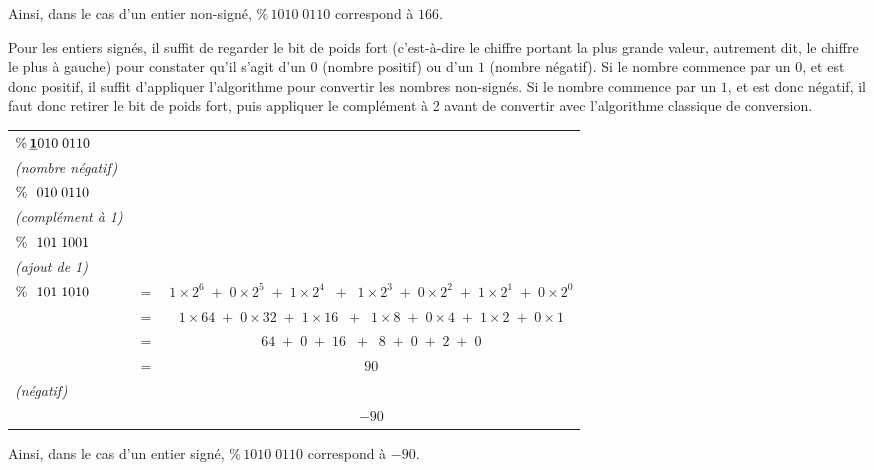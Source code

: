 \documentclass[11pt,a4paper]{article}
\begin{document}
\bigskip

Ainsi, dans le cas d'un entier non-signé, $ \% \, 1010 \; 0110 $ correspond à $ 166 $.

\bigskip

Pour les entiers signés, il suffit de regarder le bit de poids fort (c'est-à-dire le chiffre portant la plus grande valeur, autrement dit, le chiffre le plus à gauche) pour constater qu'il s'agit d'un $ 0 $ (nombre positif) ou d'un $ 1 $ (nombre négatif).
Si le nombre commence par un $ 0 $, et est donc positif, il suffit d'appliquer l'algorithme pour convertir les nombres non-signés.
Si le nombre commence par un $ 1 $, et est donc négatif, il faut donc retirer le bit de poids fort, puis appliquer le complément à 2 avant de convertir avec l'algorithme classique de conversion.

\bigskip

\begin{tabular}{l c c}
$ \% \, \text{\textbf{\underline{1}}}010 \; 0110 $  & & \\
\textit{(nombre négatif)} & & \\
$ \% \, \text{\phantom{1}}010 \; 0110 $  & & \\
\textit{(complément à 1)} & & \\
$ \% \, \text{\phantom{1}}101 \; 1001 $  & & \\
\textit{(ajout de 1)} & & \\
$ \% \, \text{\phantom{1}}101 \; 1010 $  &  $ = $  &  $ 1 \times 2^6 \; + \; 0 \times 2^5 \; + \; 1 \times 2^4  \; \; + \; \; 1 \times 2^3 \; + \; 0 \times 2^2 \; + \; 1 \times 2^1 \; + \; 0 \times 2^0 $ \\
  &  $ = $  &  $ 1 \times 64 \; + \; 0 \times 32 \; + \; 1 \times 16  \; \; + \; \; 1 \times 8 \; + \; 0 \times 4 \; + \; 1 \times 2 \; + \; 0 \times 1 $ \\
  &  $ = $  &  $ 64 \; + \; 0 \; + \; 16 \; \; + \; \; 8 \; + \; 0 \; + \; 2 \; + \; 0 $ \\
  &  $ = $  &  $ 90 $ \\
\textit{(négatif)} & & \\
  &         &  $ - 90 $ \\
\end{tabular}

\bigskip

Ainsi, dans le cas d'un entier signé, $ \% \, 1010 \; 0110 $ correspond à $ -90 $.

\bigskip
\end{document}
